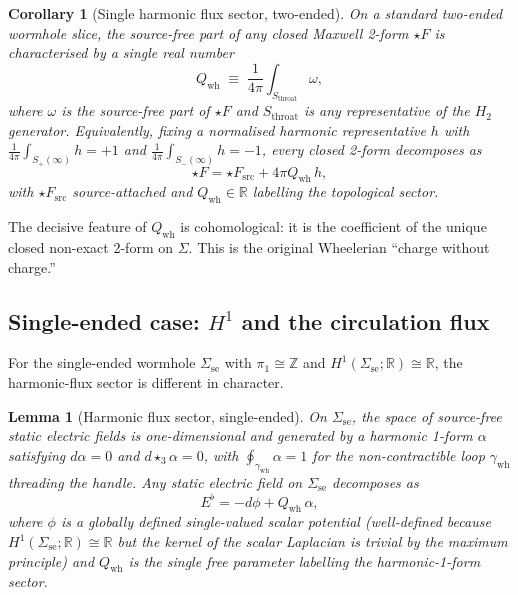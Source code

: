\documentclass[aps,prd,onecolumn,nofootinbib,superscriptaddress]{revtex4-2}
\newtheorem{lemma}{Lemma}
\newtheorem{corollary}{Corollary}
\begin{document}
\begin{corollary}[Single harmonic flux sector, two-ended]
\label{cor:single-sector-2e}
On a standard two-ended wormhole slice, the source-free part of any closed
Maxwell 2-form $\star F$ is characterised by a single real number
\begin{equation}
  Q_{\mathrm{wh}} \;\equiv\; \frac{1}{4\pi}\int_{S_{\mathrm{throat}}}\omega,
\end{equation}
where $\omega$ is the source-free part of $\star F$ and $S_{\mathrm{throat}}$
is any representative of the $H_2$ generator.  Equivalently, fixing a normalised
harmonic representative $h$ with $\frac{1}{4\pi}\int_{S_+(\infty)}h=+1$ and
$\frac{1}{4\pi}\int_{S_-(\infty)}h=-1$, every closed 2-form decomposes as
\begin{equation}
  \star F = \star F_{\mathrm{src}} + 4\pi Q_{\mathrm{wh}}\,h,
\end{equation}
with $\star F_{\mathrm{src}}$ source-attached and $Q_{\mathrm{wh}}\in\mathbb{R}$
labelling the topological sector.
\end{corollary}

The decisive feature of $Q_{\mathrm{wh}}$ is cohomological: it is the
coefficient of the unique closed non-exact 2-form on $\Sigma$.  This is the
original Wheelerian ``charge without charge.''~\cite{MisnerWheeler1957ClassicalPhysics,Wheeler1962Geometrodynamics}

\subsection{Single-ended case: \texorpdfstring{$H^1$}{H1} and the
circulation flux}

For the single-ended wormhole $\Sigma_{\mathrm{se}}$ with
$\pi_1\cong\mathbb{Z}$ and $H^1(\Sigma_{\mathrm{se}};\mathbb{R})\cong\mathbb{R}$,
the harmonic-flux sector is different in character.

\begin{lemma}[Harmonic flux sector, single-ended]
\label{lem:single-ended-sector}
On $\Sigma_{\mathrm{se}}$, the space of source-free static electric fields is
one-dimensional and generated by a harmonic 1-form $\alpha$ satisfying
$d\alpha=0$ and $d\star_3\alpha=0$, with
$\oint_{\gamma_{\mathrm{wh}}}\alpha = 1$ for the non-contractible loop
$\gamma_{\mathrm{wh}}$ threading the handle.  Any static electric field on
$\Sigma_{\mathrm{se}}$ decomposes as
\begin{equation}
  E^\flat = -d\phi + Q_{\mathrm{wh}}\,\alpha,
\end{equation}
where $\phi$ is a globally defined single-valued scalar potential (well-defined
because $H^1(\Sigma_{\mathrm{se}};\mathbb{R})\cong\mathbb{R}$ but the kernel of
the scalar Laplacian is trivial by the maximum principle) and $Q_{\mathrm{wh}}$
is the single free parameter labelling the harmonic-1-form sector.
\end{lemma}
\end{document}
